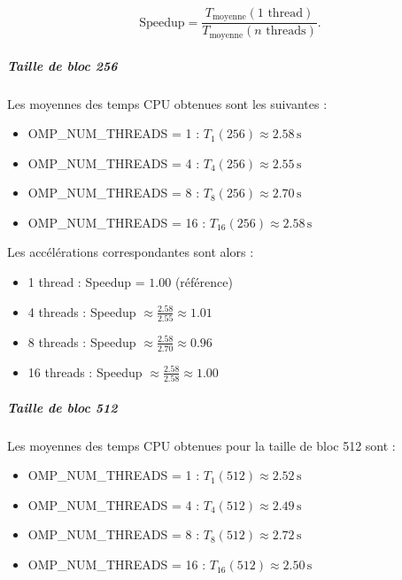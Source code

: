 \documentclass[a4paper,13pt]{book}
\begin{document}
\[
\text{Speedup} = \frac{T_{\text{moyenne}}(1 \text{ thread})}{T_{\text{moyenne}}(n \text{ threads})}.
\]

\subparagraph*{Taille de bloc 256}

Les moyennes des temps CPU obtenues sont les suivantes :
\begin{itemize}
    \item OMP\_NUM\_THREADS = 1 : \(T_{1}(256) \approx 2.58\,\text{s}\)
    \item OMP\_NUM\_THREADS = 4 : \(T_{4}(256) \approx 2.55\,\text{s}\)
    \item OMP\_NUM\_THREADS = 8 : \(T_{8}(256) \approx 2.70\,\text{s}\)
    \item OMP\_NUM\_THREADS = 16 : \(T_{16}(256) \approx 2.58\,\text{s}\)
\end{itemize}

Les accélérations correspondantes sont alors :
\begin{itemize}
    \item 1 thread : Speedup = \(1.00\) (référence)
    \item 4 threads : Speedup \(\approx \frac{2.58}{2.55} \approx 1.01\)
    \item 8 threads : Speedup \(\approx \frac{2.58}{2.70} \approx 0.96\)
    \item 16 threads : Speedup \(\approx \frac{2.58}{2.58} \approx 1.00\)
\end{itemize}

\subparagraph*{Taille de bloc 512}

Les moyennes des temps CPU obtenues pour la taille de bloc 512 sont :
\begin{itemize}
    \item OMP\_NUM\_THREADS = 1 : \(T_{1}(512) \approx 2.52\,\text{s}\)
    \item OMP\_NUM\_THREADS = 4 : \(T_{4}(512) \approx 2.49\,\text{s}\)
    \item OMP\_NUM\_THREADS = 8 : \(T_{8}(512) \approx 2.72\,\text{s}\)
    \item OMP\_NUM\_THREADS = 16 : \(T_{16}(512) \approx 2.50\,\text{s}\)
\end{itemize}
\end{document}
